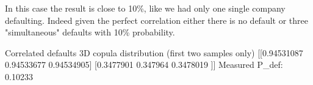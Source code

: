 In this case the result is close to 10\%, like we had only one single company defaulting. 
Indeed given the perfect correlation either there is no default or three "simultaneous" defaults with 10\% probability.

\begin{ioutput}
Correlated defaults
3D copula distribution (first two samples only)
[[0.94531087 0.94533677 0.94534905]
 [0.3477901  0.347964   0.3478019 ]]
Measured P_def: 0.10233
\end{ioutput}


%
%
%
%
%
